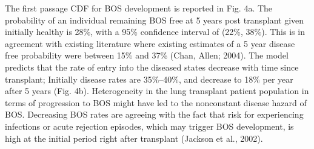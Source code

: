 \documentclass{uwstat572}
\begin{document}
The first passage CDF for BOS development is reported in Fig. 4a. The probability of an individual remaining BOS free at 5 years post transplant given initially healthy is 28\%, with a 95\% confidence interval of (22\%, 38\%). This is in agreement with existing literature where existing estimates of a 5 year disease free probability were between 15\% and 37\% (Chan, Allen; 2004). The model predicts that the rate of entry into the diseased states decrease with time since transplant; Initially disease rates are 35\%–40\%, and decrease to 18\% per year after 5 years (Fig. 4b). Heterogeneity in the lung transplant patient population in terms of progression to BOS might have led to the nonconstant disease hazard of BOS. Decreasing BOS rates are agreeing with the fact that risk for experiencing infections or acute rejection episodes, which may trigger BOS development, is high at the initial period right after transplant (Jackson et al., 2002).
\end{document}
